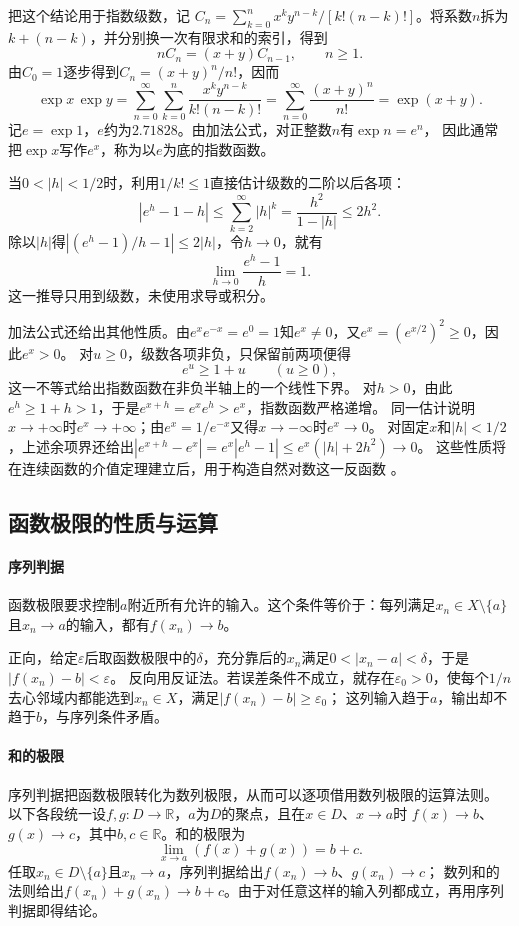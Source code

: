 把这个结论用于指数级数，记
$C_n=\sum_{k=0}^n x^ky^{n-k}/[k!(n-k)!]$。将系数$n$拆为$k+(n-k)$，并分别换一次有限求和的索引，得到
\[
 nC_n=(x+y)C_{n-1},\qquad n\geq1.
\]
由$C_0=1$逐步得到$C_n=(x+y)^n/n!$，因而
\[
 \exp x\,\exp y
 =\sum_{n=0}^{\infty}\sum_{k=0}^n\frac{x^ky^{n-k}}{k!(n-k)!}
 =\sum_{n=0}^{\infty}\frac{(x+y)^n}{n!}
 =\exp(x+y).
\]
记$e=\exp1$，$e$约为$2.71828$。由加法公式，对正整数$n$有$\exp n=e^n$，
因此通常把$\exp x$写作$e^x$，称为以$e$为底的指数函数。

当$0<|h|<1/2$时，利用$1/k!\leq1$直接估计级数的二阶以后各项：
\[
 |e^h-1-h|
 \leq\sum_{k=2}^{\infty}|h|^k
 =\frac{h^2}{1-|h|}\leq2h^2.
\]
除以$|h|$得$|(e^h-1)/h-1|\leq2|h|$，令$h\to0$，就有
\[
 \lim_{h\to0}\frac{e^h-1}{h}=1.
\]
这一推导只用到级数，未使用求导或积分。

加法公式还给出其他性质。由$e^xe^{-x}=e^0=1$知$e^x\neq0$，又$e^x=(e^{x/2})^2\geq0$，因此$e^x>0$。
对$u\geq0$，级数各项非负，只保留前两项便得
\[
 e^u\geq1+u\qquad(u\geq0),
\]
这一不等式给出指数函数在非负半轴上的一个线性下界。
对$h>0$，由此$e^h\geq1+h>1$，于是$e^{x+h}=e^xe^h>e^x$，指数函数严格递增。
同一估计说明$x\to+\infty$时$e^x\to+\infty$；由$e^x=1/e^{-x}$又得$x\to-\infty$时$e^x\to0$。
对固定$x$和$|h|<1/2$，上述余项界还给出$|e^{x+h}-e^x|=e^x|e^h-1|\leq e^x(|h|+2h^2)\to0$。
这些性质将在连续函数的介值定理建立后，用于构造自然对数这一反函数
。

\subsection{函数极限的性质与运算}
\paragraph{序列判据}

函数极限要求控制$a$附近所有允许的输入。这个条件等价于：每列满足$x_n\in X\setminus\{a\}$且$x_n\to a$的输入，都有$f(x_n)\to b$。

正向，给定$\varepsilon$后取函数极限中的$\delta$，充分靠后的$x_n$满足$0<|x_n-a|<\delta$，于是$|f(x_n)-b|<\varepsilon$。
反向用反证法。若误差条件不成立，就存在$\varepsilon_0>0$，使每个$1/n$去心邻域内都能选到$x_n\in X$，满足$|f(x_n)-b|\geq\varepsilon_0$；
这列输入趋于$a$，输出却不趋于$b$，与序列条件矛盾。

\paragraph{和的极限}
序列判据把函数极限转化为数列极限，从而可以逐项借用数列极限的运算法则。
以下各段统一设$f,g:D\to\mathbb R$，$a$为$D$的聚点，且在$x\in D$、$x\to a$时
$f(x)\to b$、$g(x)\to c$，其中$b,c\in\mathbb R$。和的极限为
\[
 \lim_{x\to a}(f(x)+g(x))=b+c.
\]
任取$x_n\in D\setminus\{a\}$且$x_n\to a$，序列判据给出$f(x_n)\to b$、$g(x_n)\to c$；
数列和的法则给出$f(x_n)+g(x_n)\to b+c$。由于对任意这样的输入列都成立，再用序列判据即得结论。

